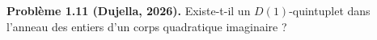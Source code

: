 \textbf{Problème 1.11 (Dujella, 2026).} Existe-t-il un $D(1)$-quintuplet dans l'anneau des entiers d'un corps quadratique imaginaire ?

